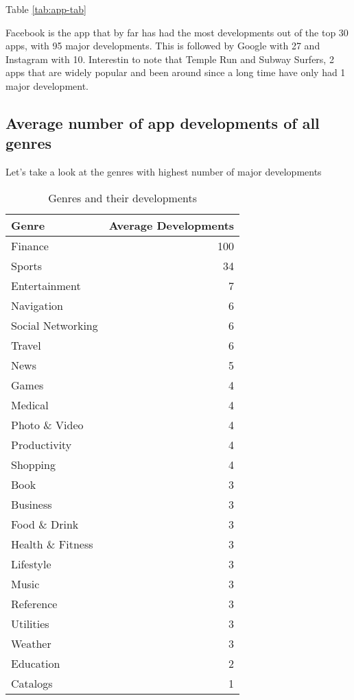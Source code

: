 \documentclass[
]{article}
\begin{document}
Table \ref{tab:app-tab}

Facebook is the app that by far has had the most developments out of the top 30 apps, with 95 major developments. This is followed by Google with 27 and Instagram with 10.
Interestin to note that Temple Run and Subway Surfers, 2 apps that are widely popular and been around since a long time have only had 1 major development.

\hypertarget{average-number-of-app-developments-of-all-genres}{%
\subsection{Average number of app developments of all genres}\label{average-number-of-app-developments-of-all-genres}}

Let's take a look at the genres with highest number of major developments

\begin{table}[!h]

\caption{\label{tab:genre-tab}Genres and their developments}
\centering
\begin{tabular}[t]{l|r}
\hline
Genre & Average Developments\\
\hline
\rowcolor{gray!6}  Finance & 100\\
\hline
Sports & 34\\
\hline
\rowcolor{gray!6}  Entertainment & 7\\
\hline
Navigation & 6\\
\hline
\rowcolor{gray!6}  Social Networking & 6\\
\hline
Travel & 6\\
\hline
\rowcolor{gray!6}  News & 5\\
\hline
Games & 4\\
\hline
\rowcolor{gray!6}  Medical & 4\\
\hline
Photo \& Video & 4\\
\hline
\rowcolor{gray!6}  Productivity & 4\\
\hline
Shopping & 4\\
\hline
\rowcolor{gray!6}  Book & 3\\
\hline
Business & 3\\
\hline
\rowcolor{gray!6}  Food \& Drink & 3\\
\hline
Health \& Fitness & 3\\
\hline
\rowcolor{gray!6}  Lifestyle & 3\\
\hline
Music & 3\\
\hline
\rowcolor{gray!6}  Reference & 3\\
\hline
Utilities & 3\\
\hline
\rowcolor{gray!6}  Weather & 3\\
\hline
Education & 2\\
\hline
\rowcolor{gray!6}  Catalogs & 1\\
\hline
\end{tabular}
\end{table}
\end{document}
